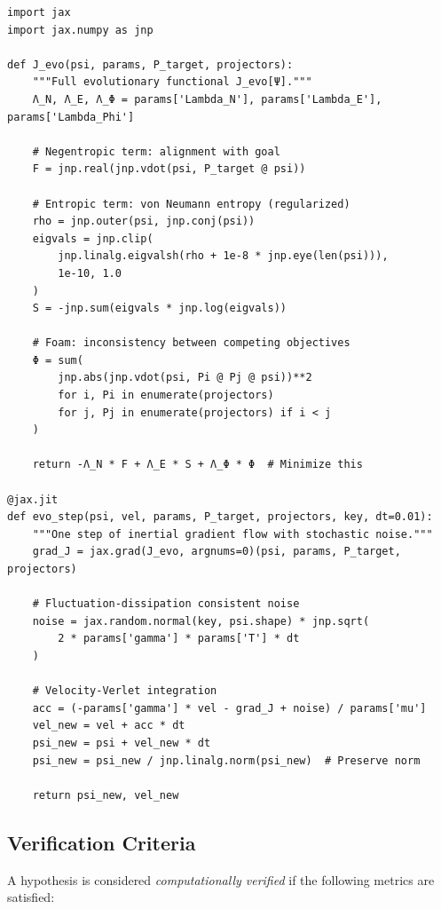 \documentclass[11pt,a4paper]{article}
\theoremstyle{plain}
\theoremstyle{definition}
\theoremstyle{remark}
\begin{document}
\begin{lstlisting}[caption={Core GRA dynamics in JAX}, label={lst:jax_impl}]
import jax
import jax.numpy as jnp

def J_evo(psi, params, P_target, projectors):
    """Full evolutionary functional J_evo[Ψ]."""
    Λ_N, Λ_E, Λ_Φ = params['Lambda_N'], params['Lambda_E'], params['Lambda_Phi']
    
    # Negentropic term: alignment with goal
    F = jnp.real(jnp.vdot(psi, P_target @ psi))
    
    # Entropic term: von Neumann entropy (regularized)
    rho = jnp.outer(psi, jnp.conj(psi))
    eigvals = jnp.clip(
        jnp.linalg.eigvalsh(rho + 1e-8 * jnp.eye(len(psi))), 
        1e-10, 1.0
    )
    S = -jnp.sum(eigvals * jnp.log(eigvals))
    
    # Foam: inconsistency between competing objectives
    Φ = sum(
        jnp.abs(jnp.vdot(psi, Pi @ Pj @ psi))**2 
        for i, Pi in enumerate(projectors) 
        for j, Pj in enumerate(projectors) if i < j
    )
    
    return -Λ_N * F + Λ_E * S + Λ_Φ * Φ  # Minimize this

@jax.jit
def evo_step(psi, vel, params, P_target, projectors, key, dt=0.01):
    """One step of inertial gradient flow with stochastic noise."""
    grad_J = jax.grad(J_evo, argnums=0)(psi, params, P_target, projectors)
    
    # Fluctuation-dissipation consistent noise
    noise = jax.random.normal(key, psi.shape) * jnp.sqrt(
        2 * params['gamma'] * params['T'] * dt
    )
    
    # Velocity-Verlet integration
    acc = (-params['gamma'] * vel - grad_J + noise) / params['mu']
    vel_new = vel + acc * dt
    psi_new = psi + vel_new * dt
    psi_new = psi_new / jnp.linalg.norm(psi_new)  # Preserve norm
    
    return psi_new, vel_new
\end{lstlisting}

\subsection{Verification Criteria}

A hypothesis is considered \textit{computationally verified} if the following metrics are satisfied:
\end{document}
